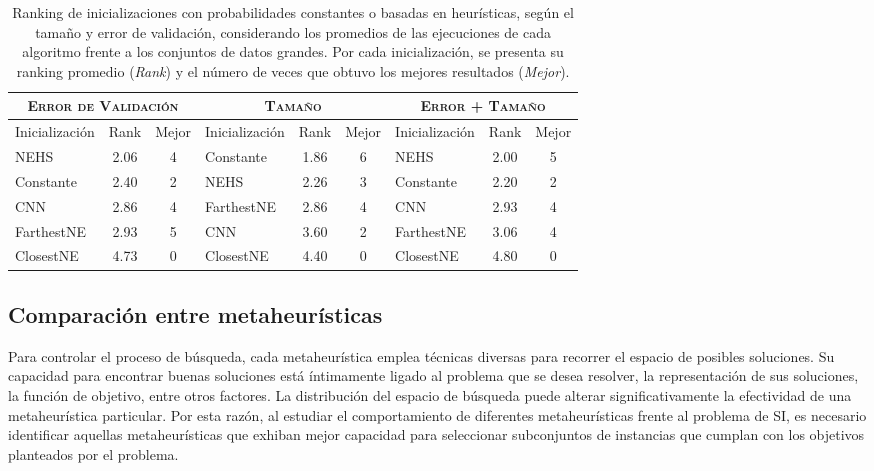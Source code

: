 \begin{table}[h!]
\centering
\begin{tabular}{l c c|l c c|l c c}
\hline
\multicolumn{3}{c|}{\textsc{Error de Validación}}
	& \multicolumn{3}{c|}{\textsc{Tamaño}}
	& \multicolumn{3}{c}{\textsc{Error + Tamaño}} \\
\hline
Inicialización & Rank & Mejor & Inicialización & Rank & Mejor & Inicialización & Rank & Mejor \\
\hline
\hline
NEHS       & 2.06 & 4 & Constante  & 1.86 & 6 & NEHS       & 2.00 & 5 \\
Constante  & 2.40 & 2 & NEHS       & 2.26 & 3 & Constante  & 2.20 & 2 \\
CNN        & 2.86 & 4 & FarthestNE & 2.86 & 4 & CNN        & 2.93 & 4 \\
FarthestNE & 2.93 & 5 & CNN        & 3.60 & 2 & FarthestNE & 3.06 & 4 \\
ClosestNE  & 4.73 & 0 & ClosestNE  & 4.40 & 0 & ClosestNE  & 4.80 & 0 \\
\hline
\end{tabular}
\caption[Ranking de probabilidades constantes o basadas en heurísticas]{Ranking de inicializaciones con probabilidades constantes o basadas en heurísticas, según el tamaño y error de validación, considerando los promedios de las ejecuciones de cada algoritmo frente a los conjuntos de datos grandes. Por cada inicialización, se presenta su ranking promedio (\emph{Rank}) y el número de veces que obtuvo los mejores resultados (\emph{Mejor}).}
\label{table-inits-rank}
\end{table} 

\subsection{Comparación entre metaheurísticas}
\label{sec-comp-meta}

Para controlar el proceso de búsqueda, cada metaheurística emplea técnicas diversas para recorrer el espacio de posibles soluciones. Su capacidad para encontrar buenas soluciones está íntimamente ligado al problema que se desea resolver, la representación de sus soluciones, la función de objetivo, entre otros factores. La distribución del espacio de búsqueda puede alterar significativamente la efectividad de una metaheurística particular. Por esta razón, al estudiar el comportamiento de diferentes metaheurísticas frente al problema de SI, es necesario identificar aquellas metaheurísticas que exhiban mejor capacidad para seleccionar subconjuntos de instancias que cumplan con los objetivos planteados por el problema.

